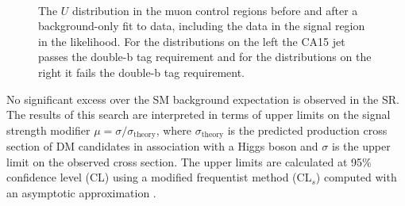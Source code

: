 \begin{figure}
  \\
 \caption{The $U$ distribution in the muon control regions before and after a background-only fit to data, including the data in the signal region in the likelihood. For the distributions on the left the CA15 jet passes the double-b tag requirement and for the distributions on the right it fails the double-b tag requirement.}
\label{Fig_cr_1}
\end{figure}

No significant excess over the SM background expectation is observed in the SR. The results of this search are interpreted in terms of upper limits on the signal strength modifier $\mu=\sigma/\sigma_\text{theory}$, where $\sigma_\text{theory}$ is the predicted production cross 
section of DM candidates in association with a Higgs boson and $\sigma$ is the upper limit on the observed cross section. 
The upper limits are calculated at 95\% confidence level (CL) using a modified frequentist method (CL$_s$) \cite{yellowReport, bib:CLS1, bib:CLS2} computed with an asymptotic approximation \cite{bib:CLS3}. 



